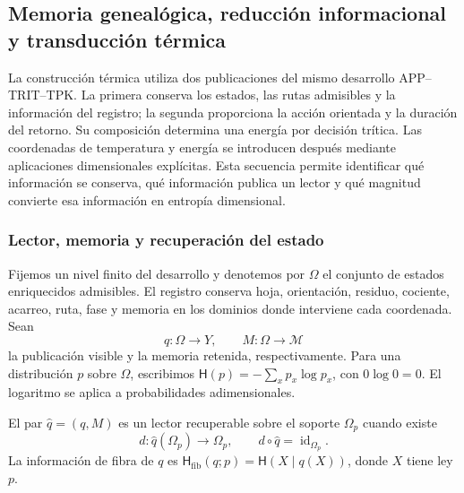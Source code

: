 
\subsection{Memoria genealógica, reducción informacional y transducción térmica}
\label{ii:sec:ii-kb-aut-desarrollo}

La construcción térmica utiliza dos publicaciones del mismo desarrollo
APP--TRIT--TPK. La primera conserva los estados, las rutas admisibles y
la información del registro; la segunda proporciona la acción orientada
y la duración del retorno. Su composición determina una energía por
decisión trítica. Las coordenadas de temperatura y energía se introducen
después mediante aplicaciones dimensionales explícitas. Esta secuencia
permite identificar qué información se conserva, qué información publica
un lector y qué magnitud convierte esa información en entropía dimensional.

\subsubsection{Lector, memoria y recuperación del estado}

Fijemos un nivel finito del desarrollo y denotemos por \(\Omega\) el
conjunto de estados enriquecidos admisibles. El registro conserva hoja,
orientación, residuo, cociente, acarreo, ruta, fase y memoria en los
dominios donde interviene cada coordenada. Sean
\[
 q:\Omega\longrightarrow Y,\qquad
 M:\Omega\longrightarrow\mathcal M
\]
la publicación visible y la memoria retenida, respectivamente. Para una
distribución \(p\) sobre \(\Omega\), escribimos
\(\mathsf H(p)=-\sum_xp_x\log p_x\), con \(0\log0=0\).
El logaritmo se aplica a probabilidades adimensionales.

\begin{definition}
El par \(\widehat q=(q,M)\) es un lector recuperable sobre el soporte
\(\Omega_p\) cuando existe
\[
 d:\widehat q(\Omega_p)\longrightarrow\Omega_p,
 \qquad d\circ\widehat q=\operatorname{id}_{\Omega_p}.
\]
La información de fibra de \(q\) es
\(\mathsf H_{\mathrm{fib}}(q;p)=\mathsf H(X\mid q(X))\), donde
\(X\) tiene ley \(p\).
\end{definition}

